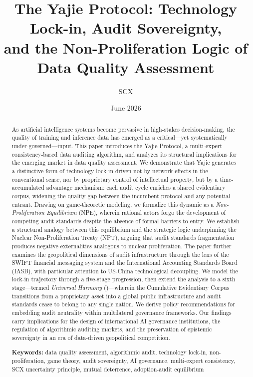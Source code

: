 \documentclass[12pt,a4paper]{article}
\title{The Yajie Protocol: Technology Lock-in, Audit Sovereignty,\\and the Non-Proliferation Logic of Data Quality Assessment}
\author{SCX}
\date{June 2026}
\theoremstyle{definition}
\theoremstyle{remark}
\begin{document}
\maketitle

\begin{abstract}
As artificial intelligence systems become pervasive in high-stakes decision-making, the quality of training and inference data has emerged as a critical—yet systematically under-governed—input. This paper introduces the Yajie Protocol, a multi-expert consistency-based data auditing algorithm, and analyzes its structural implications for the emerging market in data quality assessment. We demonstrate that Yajie generates a distinctive form of technology lock-in driven not by network effects in the conventional sense, nor by proprietary control of intellectual property, but by a time-accumulated advantage mechanism: each audit cycle enriches a shared evidentiary corpus, widening the quality gap between the incumbent protocol and any potential entrant. Drawing on game-theoretic modeling, we formalize this dynamic as a \textit{Non-Proliferation Equilibrium} (NPE), wherein rational actors forgo the development of competing audit standards despite the absence of formal barriers to entry. We establish a structural analogy between this equilibrium and the strategic logic underpinning the Nuclear Non-Proliferation Treaty (NPT), arguing that audit standards fragmentation produces negative externalities analogous to nuclear proliferation. The paper further examines the geopolitical dimensions of audit infrastructure through the lens of the SWIFT financial messaging system and the International Accounting Standards Board (IASB), with particular attention to US-China technological decoupling. We model the lock-in trajectory through a five-stage progression, then extend the analysis to a sixth stage—termed \textit{Universal Harmony} ()—wherein the Cumulative Evidentiary Corpus transitions from a proprietary asset into a global public infrastructure and audit standards cease to belong to any single nation. We derive policy recommendations for embedding audit neutrality within multilateral governance frameworks. Our findings carry implications for the design of international AI governance institutions, the regulation of algorithmic auditing markets, and the preservation of epistemic sovereignty in an era of data-driven geopolitical competition.

\bigskip
\noindent\textbf{Keywords:} data quality assessment, algorithmic audit, technology lock-in, non-proliferation, game theory, audit sovereignty, AI governance, multi-expert consistency, SCX uncertainty principle, mutual deterrence, adoption-audit equilibrium
\end{abstract}
\end{document}
